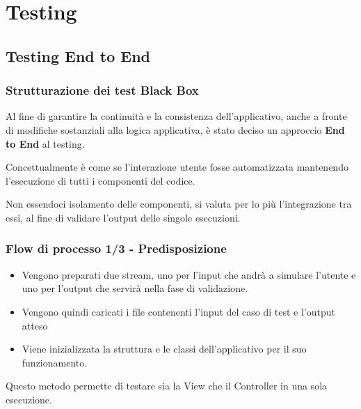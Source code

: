\section{Testing}

\subsection{Testing End to End}
\begin{frame}
    \frametitle{Strutturazione dei test Black Box}
    Al fine di garantire la continuità e la consistenza dell'applicativo, anche a fronte di modifiche sostanziali alla logica applicativa, è stato deciso un approccio \textbf{End to End} al testing.\pause

    Concettualmente è come se l'interazione utente fosse automatizzata mantenendo l'esecuzione di tutti i componenti del codice.\pause

    Non essendoci isolamento delle componenti, si valuta per lo più l'integrazione tra essi, al fine di validare l'output delle singole esecuzioni.
\end{frame}

\begin{frame}
    \frametitle{Flow di processo 1/3 - Predisposizione}
    \begin{minipage}{.31\textwidth}
        \begin{figure}
            \centering
        \end{figure}
    \end{minipage}\hfill
    \begin{minipage}{.66\textwidth}
        \begin{itemize}
            \item <1-> Vengono preparati due stream, uno per l'input che andrà a simulare l'utente e uno per l'output che servirà nella fase di validazione.
            \item <2-> Vengono quindi caricati i file contenenti l'input del caso di test e l'output atteso
            \item <3-> Viene inizializzata la struttura e le classi dell'applicativo per il suo funzionamento.
        \end{itemize}
        \pause\pause\pause
        Questo metodo permette di testare sia la View che il Controller in una sola esecuzione.
    \end{minipage}
\end{frame}

